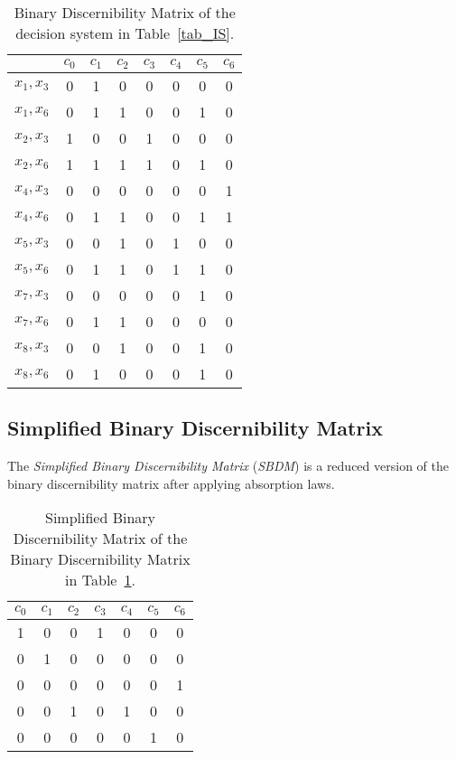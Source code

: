 \documentclass[letterpaper, twoside, openright, 12pt]{book}%
\begin{document}
	  \begin{table}[htb]
			\caption{Binary Discernibility Matrix of the decision system in Table~\ref{tab_IS}.} \label{tab_BDM}
			\centering
		 	\begin{tabular}{cccccccc}\\
			 	\hline
		 		& $c_0$ & $c_1$ & $c_2$ & $c_3$ & $c_4$ & $c_5$ & $c_6$\\
		 		\hline
				$x_1,x_3$ & 0 & 1 & 0 & 0 & 0 & 0 & 0 \\
				$x_1,x_6$ & 0 & 1 & 1 & 0 & 0 & 1 & 0 \\
				$x_2,x_3$ & 1 & 0 & 0 & 1 & 0 & 0 & 0 \\
				$x_2,x_6$ & 1 & 1 & 1 & 1 & 0 & 1 & 0 \\
				$x_4,x_3$ & 0 & 0 & 0 & 0 & 0 & 0 & 1 \\
				$x_4,x_6$ & 0 & 1 & 1 & 0 & 0 & 1 & 1 \\
				$x_5,x_3$ & 0 & 0 & 1 & 0 & 1 & 0 & 0 \\
				$x_5,x_6$ & 0 & 1 & 1 & 0 & 1 & 1 & 0 \\
				$x_7,x_3$ & 0 & 0 & 0 & 0 & 0 & 1 & 0 \\
				$x_7,x_6$ & 0 & 1 & 1 & 0 & 0 & 0 & 0 \\
				$x_8,x_3$ & 0 & 0 & 1 & 0 & 0 & 1 & 0 \\
				$x_8,x_6$ & 0 & 1 & 0 & 0 & 0 & 1 & 0 \\
				\hline
		 	\end{tabular}   
	           
	  \end{table}
	
	\subsection{Simplified Binary Discernibility Matrix}\label{sect_SBDM}
	  The \textit{Simplified Binary Discernibility Matrix} (\textit{SBDM}) is a reduced version of the binary discernibility matrix after applying absorption laws. 
	    
	  \begin{table}[htb]
		\caption{Simplified Binary Discernibility Matrix of the Binary Discernibility Matrix in Table~\ref{tab_BDM}.}
		\centering
	   	\begin{tabular}{ccccccc}\label{tab:SBDM1}\\
			\hline
			$c_0$ & $c_1$ & $c_2$ & $c_3$ & $c_4$ & $c_5$ & $c_6$\\
			\hline
			1&0&0&1&0&0&0\\
			0&1&0&0&0&0&0\\
			0&0&0&0&0&0&1\\
			0&0&1&0&1&0&0\\
			0&0&0&0&0&1&0\\
			\hline
	   	\end{tabular}             
	  \end{table}  
	   
\end{document}
